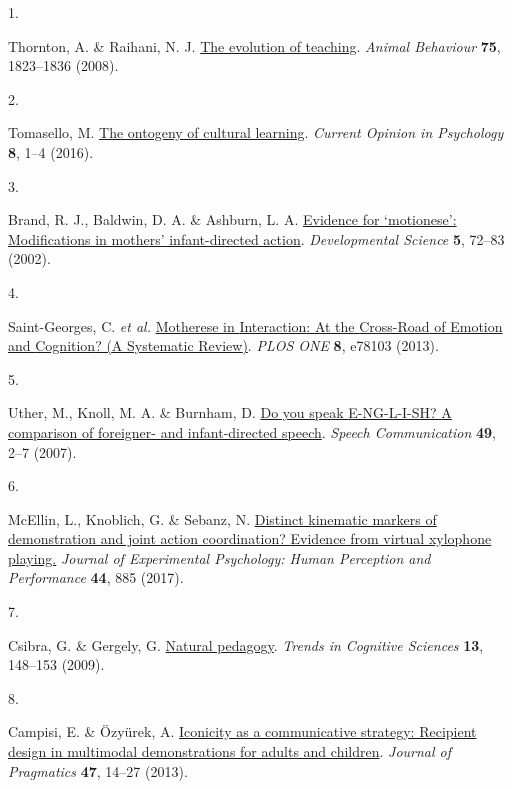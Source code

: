 \documentclass[
  man,floatsintext]{apa6}
\newlength{\cslhangindent}
\newlength{\csllabelwidth}
\newlength{\cslentryspacingunit} %
\newenvironment{CSLReferences}[2] %
 {%
  \setlength{\parindent}{0pt}
  \ifodd #1
  \let\oldpar\par
  \def\par{\hangindent=\cslhangindent\oldpar}
  \fi
  \setlength{\parskip}{#2\cslentryspacingunit}
 }%
 {}
\newcommand{\CSLLeftMargin}[1]{\parbox[t]{\csllabelwidth}{#1}}
\newcommand{\CSLRightInline}[1]{\parbox[t]{\linewidth - \csllabelwidth}{#1}\break}
\begin{document}
\hypertarget{refs}{}
\begin{CSLReferences}{0}{0}
\leavevmode{}%
\CSLLeftMargin{1. }%
\CSLRightInline{Thornton, A. \& Raihani, N. J. \href{https://doi.org/10.1016/j.anbehav.2007.12.014}{The evolution of teaching}. \emph{Animal Behaviour} \textbf{75}, 1823--1836 (2008).}

\leavevmode{}%
\CSLLeftMargin{2. }%
\CSLRightInline{Tomasello, M. \href{https://doi.org/10.1016/j.copsyc.2015.09.008}{The ontogeny of cultural learning}. \emph{Current Opinion in Psychology} \textbf{8}, 1--4 (2016).}

\leavevmode{}%
\CSLLeftMargin{3. }%
\CSLRightInline{Brand, R. J., Baldwin, D. A. \& Ashburn, L. A. \href{https://doi.org/10.1111/1467-7687.00211}{Evidence for {`motionese'}: Modifications in mothers' infant-directed action}. \emph{Developmental Science} \textbf{5}, 72--83 (2002).}

\leavevmode{}%
\CSLLeftMargin{4. }%
\CSLRightInline{Saint-Georges, C. \emph{et al.} \href{https://doi.org/10.1371/journal.pone.0078103}{Motherese in {Interaction}: {At} the {Cross-Road} of {Emotion} and {Cognition}? ({A Systematic Review})}. \emph{PLOS ONE} \textbf{8}, e78103 (2013).}

\leavevmode{}%
\CSLLeftMargin{5. }%
\CSLRightInline{Uther, M., Knoll, M. A. \& Burnham, D. \href{https://doi.org/10.1016/j.specom.2006.10.003}{Do you speak {E-NG-L-I-SH}? {A} comparison of foreigner- and infant-directed speech}. \emph{Speech Communication} \textbf{49}, 2--7 (2007).}

\leavevmode{}%
\CSLLeftMargin{6. }%
\CSLRightInline{McEllin, L., Knoblich, G. \& Sebanz, N. \href{https://doi.org/10.1037/xhp0000505}{Distinct kinematic markers of demonstration and joint action coordination? {Evidence} from virtual xylophone playing.} \emph{Journal of Experimental Psychology: Human Perception and Performance} \textbf{44}, 885 (2017).}

\leavevmode{}%
\CSLLeftMargin{7. }%
\CSLRightInline{Csibra, G. \& Gergely, G. \href{https://doi.org/10.1016/j.tics.2009.01.005}{Natural pedagogy}. \emph{Trends in Cognitive Sciences} \textbf{13}, 148--153 (2009).}

\leavevmode{}%
\CSLLeftMargin{8. }%
\CSLRightInline{Campisi, E. \& Özyürek, A. \href{https://doi.org/10.1016/j.pragma.2012.12.007}{Iconicity as a communicative strategy: {Recipient} design in multimodal demonstrations for adults and children}. \emph{Journal of Pragmatics} \textbf{47}, 14--27 (2013).}


\end{CSLReferences}
\end{document}
